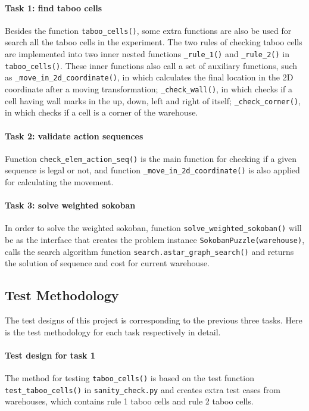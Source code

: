\documentclass{article}
\begin{document}
\paragraph{Task 1: find taboo cells}

Besides the function \texttt{taboo\_cells()}, some extra functions are also be used for search all the taboo cells in the experiment. The two rules of checking taboo cells are implemented into two inner nested functions \texttt{\_rule\_1()} and \texttt{\_rule\_2()} in \texttt{taboo\_cells()}. These inner functions also call a set of auxiliary functions, such as \texttt{\_move\_in\_2d\_coordinate()}, in which calculates the final location in the 2D coordinate after a moving transformation; \texttt{\_check\_wall()}, in which checks if a cell having wall marks in the up, down, left and right of itself; \texttt{\_check\_corner()}, in which checks if a cell is a corner of the warehouse.

\paragraph{Task 2: validate action sequences}

Function \texttt{check\_elem\_action\_seq()} is the main function for checking if a given sequence is legal or not, and function \texttt{\_move\_in\_2d\_coordinate()} is also applied for calculating the movement.

\paragraph{Task 3: solve weighted sokoban}

In order to solve the weighted sokoban, function \texttt{solve\_weighted\_sokoban()} will be as the interface that creates the problem instance \texttt{SokobanPuzzle(warehouse)}, calls the search algorithm function \texttt{search.astar\_graph\_search()} and returns the solution of sequence and cost for current warehouse.

\subsection{Test Methodology}

The test designs of this project is corresponding to the previous three tasks. Here is the test methodology for each task respectively in detail.

\paragraph{Test design for task 1} 
The method for testing \texttt{taboo\_cells()} is based on the test function \texttt{test\_taboo\_cells()} in \texttt{sanity\_check.py} and creates extra test cases from warehouses, which contains rule 1 taboo cells and rule 2 taboo cells. 
\end{document}
